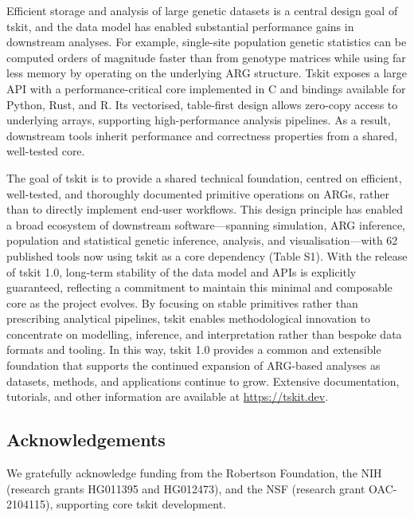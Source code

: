 \documentclass{article}
\begin{document}
Efficient storage and analysis of large genetic datasets is a central
design goal of tskit, and the data model has enabled substantial
performance gains in downstream analyses.
For example, single-site
population genetic statistics can be computed orders of magnitude faster than from
genotype matrices while using far less memory by operating
on the underlying ARG structure\cite{ralph2020efficiently}.
Tskit exposes a large API with a
performance-critical core implemented in C and bindings available for Python,
Rust, and R.
Its vectorised, table-first design allows zero-copy access to
underlying arrays, supporting high-performance analysis pipelines.
As a result,
downstream tools inherit performance and correctness properties from a shared,
well-tested core.


The goal of tskit is to provide a shared technical foundation, centred on
efficient, well-tested, and thoroughly documented primitive operations on ARGs, rather
than to directly implement end-user workflows.
This design principle has enabled a broad ecosystem of downstream
software---spanning simulation, ARG inference, population and statistical genetic
inference, analysis, and visualisation---with 62 published tools now using tskit
as a core dependency (Table S1).
With the release of tskit 1.0, long-term stability of the data model
and APIs is explicitly guaranteed, reflecting a commitment to maintain this
minimal and composable core as the project evolves. By focusing on stable
primitives rather than prescribing analytical pipelines, tskit enables
methodological innovation to concentrate on modelling, inference, and
interpretation rather than bespoke data formats and tooling. In this way, tskit
1.0 provides a common and extensible foundation that supports the continued
expansion of ARG-based analyses as datasets, methods, and applications continue
to grow.
Extensive documentation, tutorials, and other information are available
at \url{https://tskit.dev}.

\subsection*{Acknowledgements}
We gratefully acknowledge funding from the Robertson Foundation,
the NIH (research grants HG011395 and HG012473),
and the NSF (research grant OAC-2104115),
supporting core tskit development.


\end{document}
